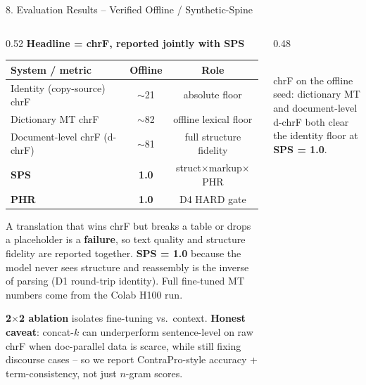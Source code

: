 \documentclass[10pt,aspectratio=169]{beamer}
\begin{document}
\begin{frame}{8. Evaluation Results -- Verified Offline / Synthetic-Spine}
\begin{columns}[T]
\begin{column}{0.52\textwidth}
\textbf{Headline = chrF, reported jointly with SPS}
\begin{table}[h]
\centering\scriptsize
\begin{tabular}{lcc}
\toprule
\textbf{System / metric} & \textbf{Offline} & \textbf{Role} \\
\midrule
Identity (copy-source) chrF & $\sim$21 & absolute floor \\
Dictionary MT chrF          & $\sim$82 & offline lexical floor \\
Document-level chrF (d-chrF) & $\sim$81 & full structure fidelity \\
\textbf{SPS}                 & \textbf{1.0} & struct$\times$markup$\times$PHR \\
\textbf{PHR}                 & \textbf{1.0} & D4 HARD gate \\
\bottomrule
\end{tabular}
\end{table}
\scriptsize A translation that wins chrF but breaks a table or drops a placeholder is a \textbf{failure}, so text quality and structure fidelity are reported together. \textbf{SPS = 1.0} because the model never sees structure and reassembly is the inverse of parsing (D1 round-trip identity). Full fine-tuned MT numbers come from the Colab H100 run.

\vspace{0.1cm}
\scriptsize \textbf{2$\times$2 ablation} isolates fine-tuning vs.\ context. \textbf{Honest caveat}: concat-$k$ can underperform sentence-level on raw chrF when doc-parallel data is scarce, while still fixing discourse cases -- so we report ContraPro-style accuracy + term-consistency, not just $n$-gram scores.
\end{column}
\begin{column}{0.48\textwidth}
\centering
{}\\
\tiny chrF on the offline seed: dictionary MT and document-level d-chrF both clear the identity floor at \textbf{SPS = 1.0}.
\end{column}
\end{columns}
\end{frame}
\end{document}
